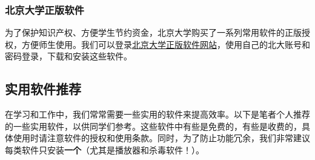 \documentclass[../main.tex]{subfiles}
\begin{document}
\subsubsection{北京大学正版软件}

为了保护知识产权、方便学生节约资金，北京大学购买了一系列常用软件的正版授权，方便师生使用。我们可以登录\href{https://software.pku.edu.cn/}{北京大学正版软件网站}，使用自己的北大账号和密码登录，下载和安装这些软件。

\subsection{实用软件推荐}

在学习和工作中，我们常常需要一些实用的软件来提高效率。以下是笔者个人推荐的一些实用软件，以供同学们参考。这些软件中有些是免费的，有些是收费的，具体使用时请注意软件的授权和使用条款。同时，为了防止功能冗余，我们非常建议每类软件只安装\textbf{一个}（尤其是播放器和杀毒软件！）。
\end{document}
